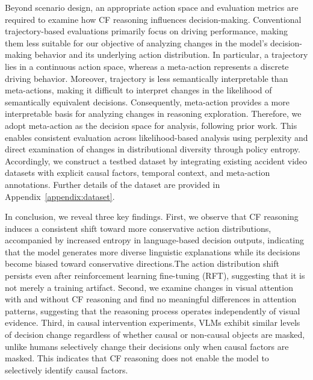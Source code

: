 \documentclass{article}
\begin{document}
Beyond scenario design, an appropriate action space and evaluation metrics are required to examine how CF reasoning influences decision-making. Conventional trajectory-based evaluations primarily focus on driving performance, making them less suitable for our objective of analyzing changes in the model's decision-making behavior and its underlying action distribution. In particular, a trajectory lies in a continuous action space, whereas a meta-action represents a discrete driving behavior. Moreover, trajectory is less semantically interpretable than meta-actions, making it difficult to interpret changes in the likelihood of semantically equivalent decisions. Consequently, meta-action provides a more interpretable basis for analyzing changes in reasoning exploration. Therefore, we adopt meta-action as the decision space for analysis, following prior work\cite{e2e-vlm:senna, e2e-vlm:alphadrive, causal:cf_vla, e2e-vlm:driveagent-r1, e2e-vlm:senna-2}. This enables consistent evaluation across likelihood-based analysis using perplexity and direct examination of changes in distributional diversity through policy entropy. Accordingly, we construct a testbed dataset by integrating existing accident video datasets \cite{dataset:ccd, dataset:nexar, dataset:coool} with explicit causal factors, temporal context, and meta-action annotations. Further details of the dataset are provided in Appendix~\ref{appendix:dataset}.

In conclusion, we reveal three key findings. First, we observe that CF reasoning induces a consistent shift toward more conservative action distributions, accompanied by increased entropy in language-based decision outputs, indicating that the model generates more diverse linguistic explanations while its decisions become biased toward conservative directions.The action distribution shift persists even after reinforcement learning fine-tuning (RFT), suggesting that it is not merely a training artifact. Second, we examine changes in visual attention with and without CF reasoning and find no meaningful differences in attention patterns, suggesting that the reasoning process operates independently of visual evidence. Third, in causal intervention experiments, VLMs exhibit similar levels of decision change regardless of whether causal or non-causal objects are masked, unlike humans selectively change their decisions only when causal factors are masked. This indicates that CF reasoning does not enable the model to selectively identify causal factors.
\end{document}
